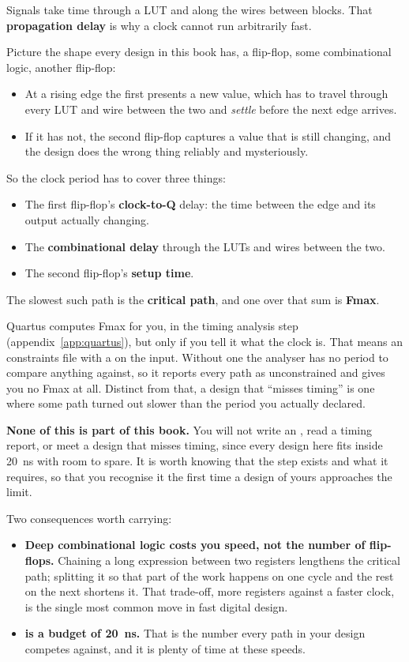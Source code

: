 Signals take time through a LUT and along the wires between blocks. That \textbf{propagation delay}
is why a clock cannot run arbitrarily fast.

Picture the shape every design in this book has, a flip-flop, some combinational logic, another
flip-flop:
\begin{itemize}
  \item At a rising edge the first presents a new value, which has to travel through every LUT and
    wire between the two and \emph{settle} before the next edge arrives.
  \item If it has not, the second flip-flop captures a value that is still changing, and the design
    does the wrong thing reliably and mysteriously.
\end{itemize}

So the clock period has to cover three things:
\begin{itemize}
  \item The first flip-flop's \textbf{clock-to-Q} delay: the time between the edge and its output
    actually changing.
  \item The \textbf{combinational delay} through the LUTs and wires between the two.
  \item The second flip-flop's \textbf{setup time}.
\end{itemize}

The slowest such path is the \textbf{critical path}, and one over that sum is \textbf{Fmax}.

Quartus computes Fmax for you, in the timing analysis step (appendix~\ref{app:quartus}), but only
if you tell it what the clock is. That means an  constraints file with a
 on the  input. Without one the analyser has no period to compare
anything against, so it reports every path as unconstrained and gives you no Fmax at all. Distinct
from that, a design that ``misses timing'' is one where some path turned out slower than the period
you actually declared.

\textbf{None of this is part of this book.} You will not write an , read a timing report,
or meet a design that misses timing, since every design here fits inside 20~ns with room to spare.
It is worth knowing that the step exists and what it requires, so that you recognise it the first
time a design of yours approaches the limit.

Two consequences worth carrying:
\begin{itemize}
  \item \textbf{Deep combinational logic costs you speed, not the number of flip-flops.} Chaining a
    long expression between two registers lengthens the critical path; splitting it so that part of
    the work happens on one cycle and the rest on the next shortens it. That trade-off, more
    registers against a faster clock, is the single most common move in fast digital design.
  \item \textbf{ is a budget of 20~ns.} That is the number every path in your design
    competes against, and it is plenty of time at these speeds.
\end{itemize}

